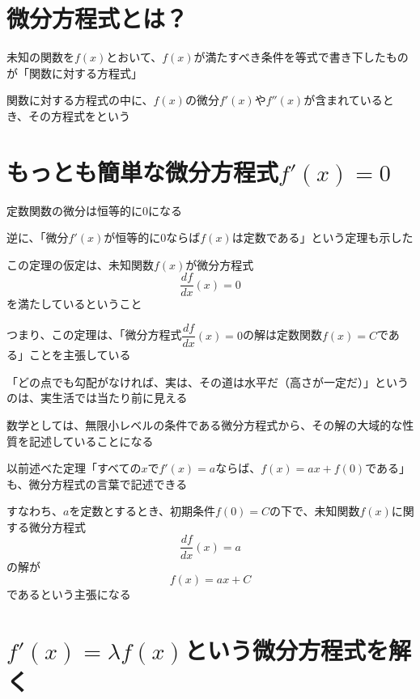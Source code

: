 \documentclass[../book_jiriki_calc]{subfiles}
\begin{document}
\section{微分方程式とは？}

未知の関数を$f(x)$とおいて、$f(x)$が満たすべき条件を等式で書き下したものが「関数に対する方程式」

関数に対する方程式の中に、$f(x)$の微分$f'(x)$や$f''(x)$が含まれているとき、その方程式をという

\section{もっとも簡単な微分方程式$f'(x)=0$}

定数関数の微分は恒等的に$0$になる

逆に、「微分$f'(x)$が恒等的に$0$ならば$f(x)$は定数である」という定理も示した

\br

この定理の仮定は、未知関数$f(x)$が微分方程式
\begin{equation}
  \dfrac{df}{dx}(x) = 0
\end{equation}
を満たしているということ

つまり、この定理は、「微分方程式$\dfrac{df}{dx}(x) = 0$の解は定数関数$f(x)=C$である」ことを主張している

\br

「どの点でも勾配がなければ、実は、その道は水平だ（高さが一定だ）」というのは、実生活では当たり前に見える

数学としては、無限小レベルの条件である微分方程式から、その解の大域的な性質を記述していることになる

\sectionline

以前述べた定理「すべての$x$で$f'(x)=a$ならば、$f(x)=ax+f(0)$である」も、微分方程式の言葉で記述できる

すなわち、$a$を定数とするとき、初期条件$f(0)=C$の下で、未知関数$f(x)$に関する微分方程式
\begin{equation}
  \dfrac{df}{dx}(x) = a
\end{equation}
の解が
\begin{equation}
  f(x) = ax + C
\end{equation}
であるという主張になる

\section{$f'(x)=\lambda f(x)$という微分方程式を解く}
\end{document}
